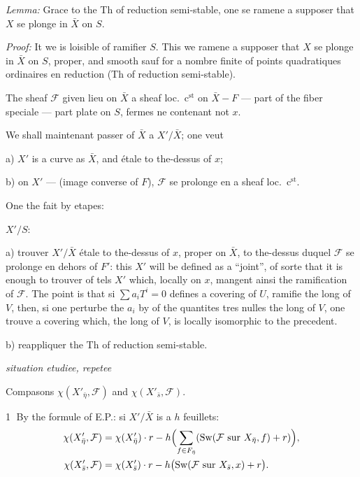\documentclass[11pt,a4paper]{article}
\theoremstyle{plain}
\theoremstyle{definition}
\DeclareMathOperator{\Sw}{Sw}
\begin{document}
\medskip

\noindent \textit{Lemma:} Grace to the Th of reduction semi-stable, one se ramene a supposer that $X$ se plonge in $\bar{X}$ on $S$.

\medskip

\noindent \textit{Proof:} It we is loisible of ramifier $S$. This we ramene a supposer that $X$ se plonge in $\bar{X}$ on $S$, proper, and smooth sauf for a nombre finite of points quadratiques ordinaires en reduction (Th of reduction semi-stable).

The sheaf $\mathcal{F}$ given lieu on $\bar{X}$ a sheaf loc.\ c$^{\text{st}}$ on $\bar{X} - F$ --- part of the fiber speciale --- part plate on $S$, fermes ne contenant not $x$.

\medskip

We shall maintenant passer of $\bar{X}$ a $X'/\bar{X}$; one veut

a) $X'$ is a curve as $\bar{X}$, and étale to the-dessus of $x$;

b) on $X'$ --- (image converse of $F$), $\mathcal{F}$ se prolonge en a sheaf loc.\ c$^{\text{st}}$.

\medskip

One the fait by etapes:

\medskip

$X'/S$:

a) trouver $X'/\bar{X}$ étale to the-dessus of $x$, proper on $\bar{X}$, to the-dessus duquel $\mathcal{F}$ se prolonge en dehors of $F'$: this $X'$ will be defined as a ``joint'', of sorte that it is enough to trouver of tels $X'$ which, locally on $x$, mangent ainsi the ramification of $\mathcal{F}$. The point is that si $\sum a_i T^i = 0$ defines a covering of $U$, ramifie the long of $V$, then, si one perturbe the $a_i$ by of the quantites tres nulles the long of $V$, one trouve a covering which, the long of $V$, is locally isomorphic to the precedent.

b) reappliquer the Th of reduction semi-stable.

\medskip

\noindent \textit{situation etudiee, repetee}

\newpage

Compasons $\chi(X'_{\bar{\eta}}, \mathcal{F})$ and $\chi(X'_{\bar{s}}, \mathcal{F})$.

\textcircled{1} By the formule of E.P.: si $X'/\bar{X}$ is a $h$ feuillets:
\begin{align*}
\chi(X'_{\bar{\eta}}, \mathcal{F}) &= \chi(X'_{\bar{\eta}}) \cdot r - h\Bigl(\sum_{f \in F_{\bar{\eta}}} (\Sw(\mathcal{F} \text{ sur } X_{\bar{\eta}}, f) + r)\Bigr), \\
\chi(X'_{\bar{s}}, \mathcal{F}) &= \chi(X'_{\bar{s}}) \cdot r - h\bigl(\Sw(\mathcal{F} \text{ sur } X_{\bar{s}}, x) + r\bigr).
\end{align*}
\end{document}
